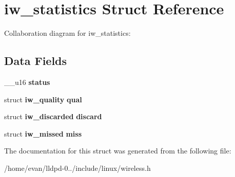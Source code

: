\section{iw\-\_\-statistics \-Struct \-Reference}
\label{structiw__statistics}


\-Collaboration diagram for iw\-\_\-statistics\-:
\subsection*{\-Data \-Fields}
\begin{DoxyCompactItemize}
\item 
\-\_\-\-\_\-u16 {\bfseries status}\label{structiw__statistics_aa244b54c32c745e07d8378ae940cd381}

\item 
struct {\bf iw\-\_\-quality} {\bfseries qual}\label{structiw__statistics_a7e12691da450e02fbae12365d41697ba}

\item 
struct {\bf iw\-\_\-discarded} {\bfseries discard}\label{structiw__statistics_a7109919d2d1e87c864647ecf88d3dccf}

\item 
struct {\bf iw\-\_\-missed} {\bfseries miss}\label{structiw__statistics_aec9c5a199d2131cb438e99b575bca08a}

\end{DoxyCompactItemize}


\-The documentation for this struct was generated from the following file\-:\begin{DoxyCompactItemize}
\item 
/home/evan/lldpd-\/0../include/linux/wireless.\-h\end{DoxyCompactItemize}
